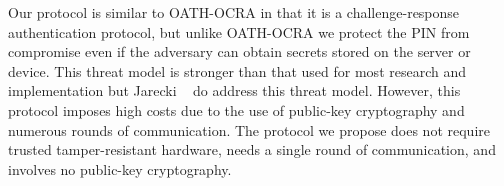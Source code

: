 Our protocol is similar to OATH-OCRA in that it is a challenge-response authentication protocol, but unlike OATH-OCRA we protect the PIN from compromise even if the adversary can obtain secrets stored on the server or device.
This threat model is stronger than that used for most research and implementation but Jarecki \etal~\cite{JareckiJKSS21} do address this threat model.
However, this protocol imposes high costs due to the use of public-key cryptography and numerous rounds of communication. 
The protocol we propose does not require trusted tamper-resistant hardware, needs a single round of communication, and involves no public-key cryptography.


